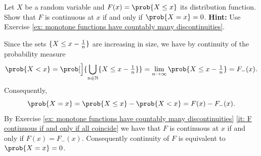 
\begin{exercise}[subtitle={Discontinuity points of distribution functions \Coffeecup\Coffeecup}]
    Let \(X\) be a random variable and \(F(x) = \prob{X \le x}\) its
    distribution function. Show that \(F\) is continuous at \(x\) if and only if
    \(\prob{X = x} = 0\).
    \textbf{Hint:} Use Exercise \ref{ex: monotone functions have countably many discontinuities}.
\end{exercise}
\begin{solution}
    Since the sets \(\{X \le x - \frac1n\}\) are increasing
    in size, we have by continuity of the probability measure
    \[
        \prob{X < x}
        = \prob[\Big]{\bigcup_{n\in \nat} \set{X \le x - \tfrac1n}}
        = \lim_{n\to\infty} \prob{X \le x - \tfrac1n}
        = F_-(x).
    \]
    Consequently,
    \[
        \prob{X = x} = \prob{X \le x} - \prob{X < x} = F(x) - F_-(x).
    \]
    By Exercise \ref{ex: monotone functions have countably many
    discontinuities} \ref{it: F continuous if and only if all coincide} we
    have that \(F\) is continuous at \(x\) if and only if \(F(x) = F_-(x)\).
    Consequently continuity of \(F\) is equivalent to \(\prob{X = x} = 0\).
\end{solution}
